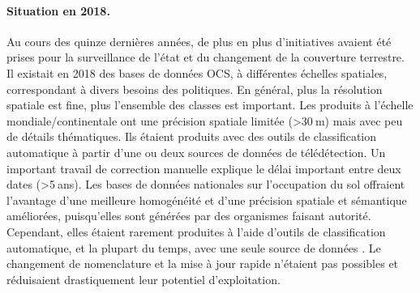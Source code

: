 \paragraph{Situation en 2018.} Au cours des quinze dernières années, de plus en plus d'initiatives avaient été prises pour la surveillance de l'état et du changement de la couverture terrestre. Il existait en 2018 des bases de données OCS, à différentes échelles spatiales, correspondant à divers besoins des politiques. En général, plus la résolution spatiale est fine, plus l'ensemble des classes est important. Les produits à l'échelle mondiale/continentale ont une précision spatiale limitée (>30$\:$m) mais avec peu de détails thématiques. Ils étaient produits avec des outils de classification automatique à partir d'une ou deux sources de données de télédétection. Un important travail de correction manuelle explique le délai important entre deux dates (>5$\:$ans). Les bases de données nationales sur l'occupation du sol offraient l'avantage d'une meilleure homogénéité et d'une précision spatiale et sémantique améliorées, puisqu'elles sont générées par des organismes faisant autorité. Cependant, elles étaient rarement produites à l'aide d'outils de classification automatique, et la plupart du temps,
avec une seule source de données . Le changement de nomenclature et la mise à jour rapide n'étaient pas possibles et réduisaient drastiquement leur potentiel d'exploitation.

